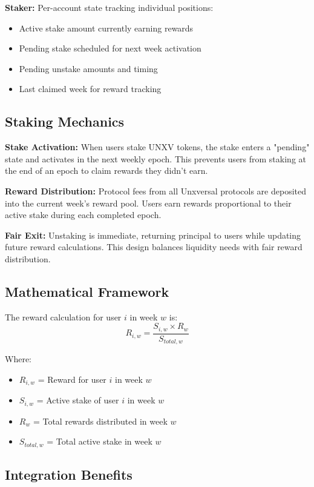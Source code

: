 \documentclass[12pt]{article}
\begin{document}
\textbf{Staker:} Per-account state tracking individual positions:
\begin{itemize}
    \item Active stake amount currently earning rewards
    \item Pending stake scheduled for next week activation
    \item Pending unstake amounts and timing
    \item Last claimed week for reward tracking
\end{itemize}

\subsection{Staking Mechanics}

\textbf{Stake Activation:} When users stake UNXV tokens, the stake enters a "pending" state and activates in the next weekly epoch. This prevents users from staking at the end of an epoch to claim rewards they didn't earn.

\textbf{Reward Distribution:} Protocol fees from all Unxversal protocols are deposited into the current week's reward pool. Users earn rewards proportional to their active stake during each completed epoch.

\textbf{Fair Exit:} Unstaking is immediate, returning principal to users while updating future reward calculations. This design balances liquidity needs with fair reward distribution.

\subsection{Mathematical Framework}

The reward calculation for user $i$ in week $w$ is:
$$R_{i,w} = \frac{S_{i,w} \times R_w}{S_{total,w}}$$

Where:
\begin{itemize}
    \item $R_{i,w}$ = Reward for user $i$ in week $w$
    \item $S_{i,w}$ = Active stake of user $i$ in week $w$
    \item $R_w$ = Total rewards distributed in week $w$
    \item $S_{total,w}$ = Total active stake in week $w$
\end{itemize}

\subsection{Integration Benefits}
\end{document}
